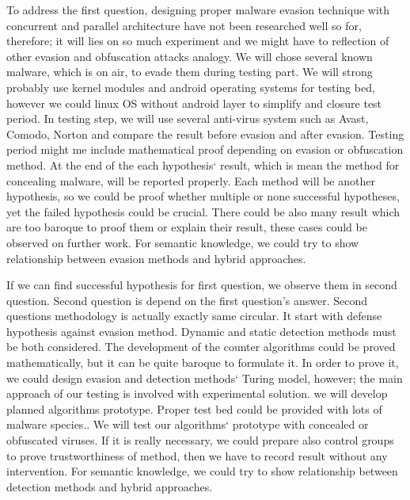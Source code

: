 	To address the first question, designing proper malware evasion technique with concurrent and parallel architecture have not been researched well so for, therefore; it will lies on so much experiment and we might have to reflection of other evasion and obfuscation attacks analogy.  We will chose several known malware, which is on air, to  evade them during testing part. We will strong probably use kernel modules and android operating systems for testing bed, however we could linux OS without android layer to simplify and closure test period. In testing step, we will use several anti-virus system such as Avast, Comodo, Norton and compare the result before evasion and after evasion. Testing period might me include mathematical proof depending on evasion or obfuscation method. At the end of the each hypothesis` result, which is mean the method for concealing malware, will be reported properly. Each method will be another hypothesis, so we could be proof whether multiple or none successful hypotheses, yet the failed hypothesis could be crucial. There could be also many result which are too baroque to proof them or explain their result, these cases could be observed on further work. For semantic knowledge, we could try to show relationship between evasion methods and hybrid approaches.

	If we can find successful hypothesis for first question, we observe them in second question. Second question is depend on the first question's answer. Second questions methodology is actually exactly same circular. It start with defense hypothesis against evasion method. Dynamic and static detection methods must be both considered. The development of the counter algorithms could be proved mathematically, but it can be quite baroque to formulate it. In order to prove it, we could design evasion and detection methods` Turing model, however; the main approach of our testing is involved with experimental solution. we will develop planned algorithms prototype. Proper test bed could be provided with lots of malware species.. We will test our algorithms` prototype with concealed or obfuscated viruses. If it is really necessary, we could prepare also control groups to prove trustworthiness of method, then we have to record result without any intervention. For semantic knowledge, we could try to show relationship between detection methods and hybrid approaches.
	\newpage

